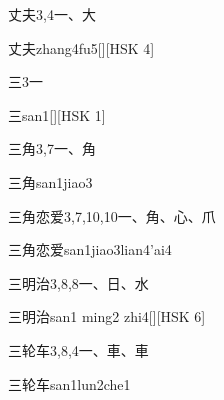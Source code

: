 \begin{Entry}{丈夫}{3,4}{⼀、⼤}
  \begin{Phonetics}{丈夫}{zhang4fu5}[][HSK 4]
  \end{Phonetics}
\end{Entry}

\begin{Entry}{三}{3}{⼀}
  \begin{Phonetics}{三}{san1}[][HSK 1]
  \end{Phonetics}
\end{Entry}

\begin{Entry}{三角}{3,7}{⼀、⾓}
  \begin{Phonetics}{三角}{san1jiao3}
  \end{Phonetics}
\end{Entry}

\begin{Entry}{三角恋爱}{3,7,10,10}{⼀、⾓、⼼、⽖}
  \begin{Phonetics}{三角恋爱}{san1jiao3lian4'ai4}
  \end{Phonetics}
\end{Entry}

\begin{Entry}{三明治}{3,8,8}{⼀、⽇、⽔}
  \begin{Phonetics}{三明治}{san1 ming2 zhi4}[][HSK 6]
  \end{Phonetics}
\end{Entry}

\begin{Entry}{三轮车}{3,8,4}{⼀、⾞、⾞}
  \begin{Phonetics}{三轮车}{san1lun2che1}
  \end{Phonetics}
\end{Entry}

